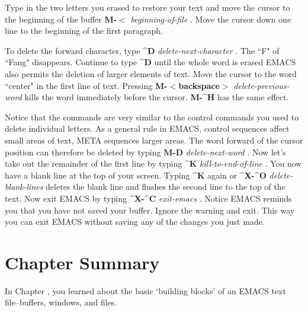 Type in the two letters you erased to restore your text and move the
cursor to the beginning of the buffer {\bf{}M-$<${}}
{\it{}beginning-of-file} .  Move the cursor
down one line to the beginning of the first paragraph.

To delete the forward character, type {\bf{}\^{}D}
{\it{}delete-next-character} .  The ``F"
of ``Fang" disappears.  Continue to type {\bf{}\^{}D} until the whole
word is erased EMACS also permits the deletion of larger elements of
text.  Move the cursor to the word ``center" in the first line of
text.  Pressing {\bf{}M-$<${}backspace$>${}}
{\it{}delete-previous-word}  kills the
word immediately before the cursor.  {\bf{}M-\^{}H} has the same
effect.

Notice that the commands are very similar to the control commands you
used to delete individual letters.  As a general rule in EMACS,
control sequences affect small areas of text, META sequences larger
areas.  The word forward of the cursor position can therefore be
deleted by typing {\bf{}M-D} {\it{}delete-next-word}
.  Now let's take out the remainder of the
first line by typing {\bf{}\^{}K} {\it{}kill-to-end-of-line}
.  You now have a blank line at the top of
your screen.  Typing {\bf{}\^{}K} again or {\bf{}\^{}X-\^{}O}
{\it{}delete-blank-lines}  deletes the blank
line and flushes the second line to the top of the text.  Now exit
EMACS by typing {\bf{}\^{}X-\^{}C} {\it{}exit-emacs}
.  Notice EMACS reminds you that you have not saved
your buffer.  Ignore the warning and exit.  This way you can exit
EMACS without saving any of the changes you just made.

\section{Chapter \thechapter{} Summary}

In Chapter \thechapter{}, you learned about the basic `building
blocks' of an EMACS text file--buffers, windows, and files.

